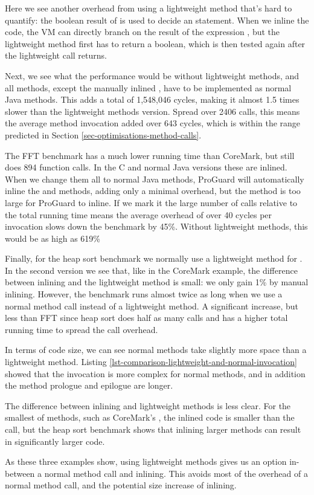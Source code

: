 Here we see another overhead from using a lightweight method that's hard to quantify: the boolean result of  is used to decide an  statement. When we inline the code, the VM can directly branch on the result of the expression , but the lightweight method first has to return a boolean, which is then tested again after the lightweight call returns.

Next, we see what the performance would be without lightweight methods, and all methods, except the manually inlined , have to be implemented as normal Java methods. This adds a total of 1,548,046 cycles, making it almost 1.5 times slower than the lightweight methods version. Spread over 2406 calls, this means the average method invocation added over 643 cycles, which is within the range predicted in Section \ref{sec-optimisations-method-calls}.

The FFT benchmark has a much lower running time than CoreMark, but still does 894 function calls. In the C and normal Java versions these are inlined. When we change them all to normal Java methods, ProGuard will automatically inline the  and  methods, adding only a minimal overhead, but the  method is too large for ProGuard to inline. If we mark it  the large number of calls relative to the total running time means the average overhead of over 40 cycles per invocation slows down the benchmark by 45\%. Without lightweight methods, this would be as high as 619\%

Finally, for the heap sort benchmark we normally use a lightweight method for . In the second version we see that, like in the CoreMark example, the difference between inlining and the lightweight method is small: we only gain 1\% by manual inlining. However, the benchmark runs almost twice as long when we use a normal method call instead of a lightweight method. A significant increase, but less than FFT since heap sort does half as many calls and has a higher total running time to spread the call overhead.

In terms of code size, we can see normal methods take slightly more space than a lightweight method. Listing \ref{lst-comparison-lightweight-and-normal-invocation} showed that the invocation is more complex for normal methods, and in addition the method prologue and epilogue are longer.

The difference between inlining and lightweight methods is less clear. For the smallest of methods, such as CoreMark's , the inlined code is smaller than the call, but the heap sort benchmark shows that inlining larger methods can result in significantly larger code.

As these three examples show, using lightweight methods gives us an option in-between a normal method call and inlining. This avoids most of the overhead of a normal method call, and the potential size increase of inlining.
